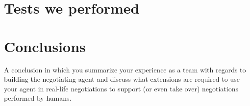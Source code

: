 \documentclass[11pt,a4paper]{report}
\begin{document}
%
%




\newpage



%

\section*{Tests we performed}


\section*{Conclusions}

A conclusion in which you summarize your experience as a team with regards to building the
negotiating agent and discuss what extensions are required to use your agent in real-life negotiations to support (or even take over) negotiations performed by humans.
\end{document}
